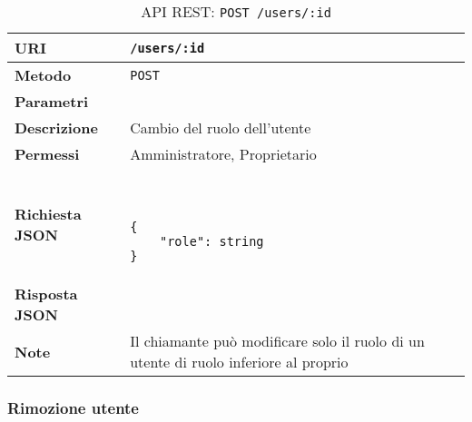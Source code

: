         \begin{table}[H]
            \begin{center}
                \begin{tabular}{p{} p{}}
                    \toprule
                    \textbf{URI} & \texttt{/users/:id} \\ \midrule
                    \textbf{Metodo} & \texttt{POST} \\ \midrule
                    \textbf{Parametri} & \\ \midrule
                    \textbf{Descrizione} & Cambio del ruolo dell'utente \\ \midrule
                    \textbf{Permessi} & Amministratore, Proprietario  \\ \midrule
                    \textbf{Richiesta JSON} & \
                        \begin{lstlisting}[basicstyle={\ttfamily}]
{
    "role": string
}
                        \end{lstlisting}
                        \\ \midrule
                    \textbf{Risposta JSON} & \\ \midrule
                    \textbf{Note} & Il chiamante può modificare solo il ruolo di un utente di ruolo
                        inferiore al proprio \\
                    \bottomrule
                \end{tabular}
                \caption{API REST: \texttt{POST /users/:id}}
            \end{center}
        \end{table}

    \subsubsection{Rimozione utente}

